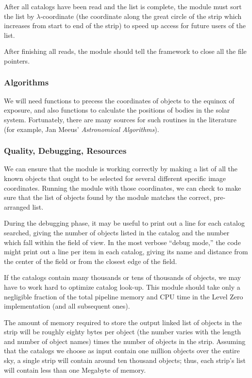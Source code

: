After all catalogs have been read and the list is complete,
the module must sort the list by $\lambda$-coordinate
(the coordinate along the great circle of the strip which
increases from start to end of the strip)
to speed up access for future users of the list.

After finishing all reads, the module should tell the framework
to close all the file pointers.  

\subsubsection {Algorithms}

  We will need functions to precess the coordinates
of objects to the equinox of exposure, and also functions
to calculate the positions of bodies in the solar system.
Fortunately, there are many sources for such routines
in the literature (for example, Jan Meeus' {\it Astronomical
Algorithms}).

\subsubsection {Quality, Debugging, Resources}

  We can ensure that the \kom module is working correctly by
making a list of all the known objects that ought to be selected
for several different specific image coordinates.
Running the module with those coordinates, we can check to make
sure that the list of objects found by the module matches the
correct, pre-arranged list.

  During the debugging phase, it may be useful to print out
a line for each catalog searched, giving the number of objects
listed in the catalog and the number which fall within the
field of view.  In the most verbose ``debug mode,'' the code
might print out a line per item in each catalog, giving its
name and distance from the center of the field or from the 
closest edge of the field.

  If the catalogs contain many thousands or tens of thousands
of objects, we may have to work hard to optimize catalog look-up.
This module should take only a negligible fraction of the total
pipeline memory and CPU time in the Level Zero implementation
(and all subsequent ones).

  The amount of memory required to store the output linked list
of objects in the strip will be roughly eighty bytes per object
(the number varies with the length and number of object names)
times the number of objects in the strip.  Assuming that the 
catalogs we choose as input contain one million objects over the 
entire sky, a single strip will contain around ten thousand 
objects; thus, each strip's list will contain less than one Megabyte
of memory.

